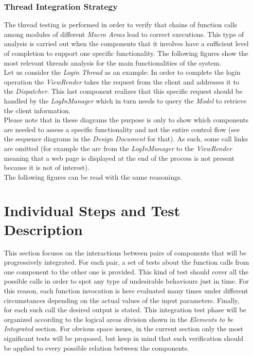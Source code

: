 \documentclass[11pt,a4paper]{report}
\begin{document}
\subsection{Thread Integration Strategy}
The thread testing is performed in order to verify that chains of function calls among modules of different \textit{Macro Areas} lead to correct executions. This type of analysis is carried out when the components that it involves have a sufficient level of completion to support one specific functionality. The following figures show the most relevant threads analysis for the main functionalities of the system.\\Let us consider the \textit{Login Thread} as an example:
\noindent In order to complete the login operation the \textit{ViewRender} takes the request from the client and addresses it to the \textit{Dispatcher}. This last component realizes that this specific request should be handled by the \textit{LogInManager} which in turn needs to query the \textit{Model} to retrieve the client information.\\Please note that in these diagrams the purpose is only to show which components are needed to assess a specific functionality and not the entire control flow (see the sequence diagrams in the \textit{Design Document} for that). As such, some call links are omitted (for example the arc from the \textit{LogInManager} to the \textit{ViewRender} meaning that a web page is displayed at the end of the process is not present because it is not of interest).\\The following figures can be read with the same reasonings.

\chapter[Individual Steps and Test Description]{Individual Steps and Test \\Description}
This section focuses on the interactions between pairs of components that will be progressively integrated. For each pair, a set of tests about the  function calls from one component to the other one is provided. This kind of test should cover all the possible calls in order to spot any type of undesirable behaviours just in time. For this reason, each function invocation is here evaluated many times under different circumstances depending on the actual values of the input parameters. Finally, for each such call the desired output is stated.
This integration test phase will be organized according to the logical areas division shown in the \textit{Elements to be Integrated} section.
For obvious space issues, in the current section only the most significant tests will be proposed, but keep in mind that such verification should be applied to every possible relation between the components.
\end{document}
